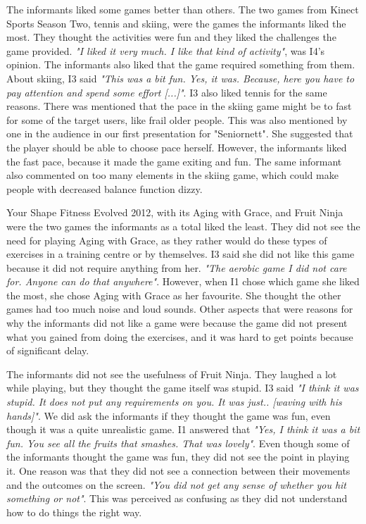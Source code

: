 The informants liked some games better than others. The two games from Kinect Sports Season Two, tennis and skiing, were the games the informants liked the most. They thought the activities were fun and they liked the challenges the game provided. \emph{"I liked it very much. I like that kind of activity"}, was I4's opinion. The informants also liked that the game required something from them. About skiing, I3 said \emph{"This was a bit fun. Yes, it was. Because, here you have to pay attention and spend some effort [...]"}. I3 also liked tennis for the same reasons.  There was mentioned that the pace in the skiing game might be to fast for some of the target users, like frail older people. This was also mentioned by one in the audience in our first presentation for "Seniornett".  She suggested that the player should be able to choose pace herself. However, the informants liked the fast pace, because it made the game exiting and fun. The same informant also commented on too many elements in the skiing game, which could make people with decreased balance function dizzy. 

Your Shape Fitness Evolved 2012, with its Aging with Grace, and Fruit Ninja were the two games the informants as a total liked the least. They did not see the need for playing Aging with Grace, as they rather would do these types of exercises in a training centre or by themselves. I3 said she did not like this game because it did not require anything from her. \emph{"The aerobic game I did not care for. Anyone can do that anywhere"}. However, when I1 chose which game she liked the most, she chose Aging with Grace as her favourite. She thought the other games had too much noise and loud sounds. Other aspects that were reasons for why the informants did not like a game were because the game did not present what you gained from doing the exercises, and it was hard to get points because of significant delay. 

The informants did not see the usefulness of Fruit Ninja. They laughed a lot while playing, but they thought the game itself was stupid. I3 said \emph{"I think it was stupid. It does not put any requirements on you. It was just.. [waving with his hands]"}. We did ask the informants if they thought the game was fun, even though it was a quite unrealistic game. I1 answered that \emph{"Yes, I think it was a bit fun. You see all the fruits that smashes. That was lovely"}. Even though some of the informants thought the game was fun, they did not see the point in playing it. One reason was that they did not see a connection between their movements and the outcomes on the screen. \emph{"You did not get any sense of whether you hit something or not"}. This was perceived as confusing as they did not understand how to do things the right way. 

